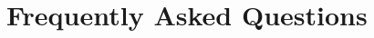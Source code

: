 \documentclass[pdflatex,letterpaper,twoside,12pt]{book}
\begin{document}

\chapter{Frequently Asked Questions}

\iffalse %
 * Need to develop a FAQ - Net control runs event, Do Not Call 911,
   Don't know? Ask Net control, etc... Get food, and stay hydrated! 3rd
   party traffic is allowed - know when to hand the radio to that person! 
\fi %
\end{document}
